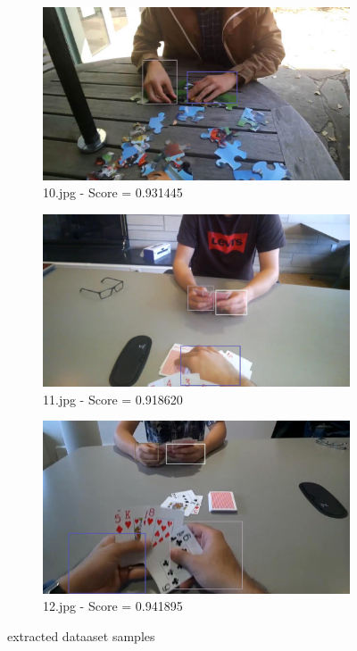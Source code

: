 \begin{figure}
    \centering
    \begin{subfigure}[b]{0.3 \textwidth}
        \centering
        \includegraphics[width=\textwidth]{images/handDetection/10.jpg}
        \caption{10.jpg - Score = 0.931445}
        
    \end{subfigure}
    \hfill
    \begin{subfigure}[b]{0.3\textwidth}
        \centering
        \includegraphics[width=\textwidth]{images/handDetection/11.jpg}
        \caption{11.jpg - Score = 0.918620}
        
    \end{subfigure}
    \begin{subfigure}[b]{0.3\textwidth}
        \centering
        \includegraphics[width=\textwidth]{images/handDetection/12.jpg}
        \caption{12.jpg - Score = 0.941895}
        
    \end{subfigure}
       \caption{extracted dataaset samples}
       
\end{figure}


